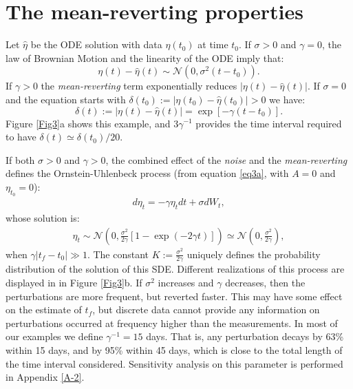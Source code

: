 \documentclass{article}
\begin{document}
\section{The mean-reverting properties}
Let $\hat\eta$ be the ODE solution with data $\eta(t_0)$ at time $t_0$. If $\sigma>0$ and $\gamma=0$, the law of Brownian Motion and the linearity of the ODE imply that:
$$\eta(t)-\hat\eta(t)\sim \mathcal N\left(0,\sigma^2(t-t_0)\right).$$
If $\gamma>0$ the {\it mean-reverting} term exponentially reduces $\left|\eta(t)-\hat\eta(t)\right|$. If $\sigma=0$ and the equation starts with $\delta(t_0):=|\eta(t_0)-\hat\eta(t_0)|>0$ we have:
$$\delta(t):=\left|\eta(t)-\hat\eta(t)\right|=\exp[-\gamma(t-t_0)].$$
Figure \ref{Fig3}a shows this example, and $3\gamma^{-1}$ provides the time interval required to have $\delta(t)\simeq\delta(t_0)/20$.

If both $\sigma>0$ and $\gamma>0$, the combined effect of the {\it noise} and the {\it mean-reverting} defines the Ornstein-Uhlenbeck process (from equation \ref{eq3a}, with $A=0$ and $\eta_{t_0}=0$):
\begin{align}\label{eq4a}
d\eta_t=-\gamma\eta_t dt+\sigma dW_t,
\end{align}
whose solution is:
\begin{align}\label{eq4b}
\eta_t\sim\mathcal N\left(0,\frac{\sigma^2}{2\gamma}\left[1-\exp(-2\gamma t)\right]\right)\simeq \mathcal N\left(0,\frac{\sigma^2}{2\gamma}\right),
\end{align}
when $\gamma|t_f-t_0|\gg1$. The constant $K:=\frac{\sigma^2}{2\gamma}$ uniquely defines the probability distribution of the solution of this SDE. Different realizations of this process are displayed in in Figure \ref{Fig3}b. If $\sigma^2$ increases and $\gamma$ decreases, then the perturbations are more frequent, but reverted faster. This may have some effect on the estimate of $t_f$, but discrete data cannot provide any information on perturbations occurred at frequency higher than the measurements. In most of our examples we define $\gamma^{-1}=15$ days. That is, any perturbation decays by 63\% within 15 days, and by 95\% within 45 days, which is close to the total length of the time interval considered. Sensitivity analysis on this parameter is performed in Appendix \ref{A-2}.
\end{document}

